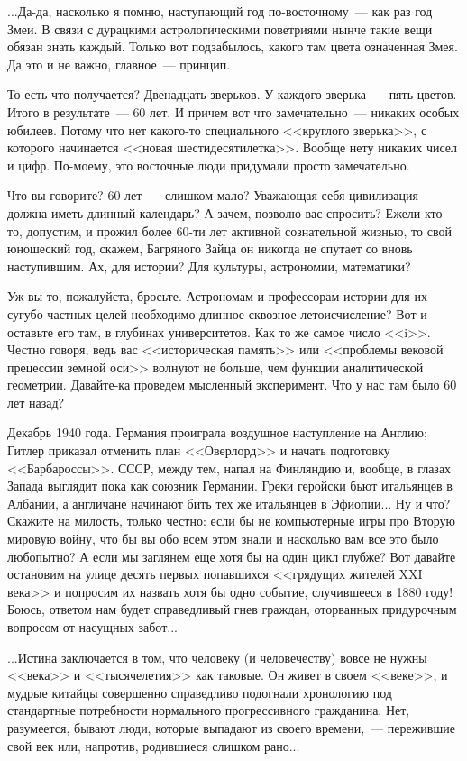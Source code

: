 \documentclass{scrbook}
\newcommand{\flqq}{<<}
\newcommand{\frqq}{>>}
\newcommand{\mdash}{~--- }
\newcommand{\commamdash}{~--- } %
\begin{document}
...Да-да, насколько я помню, наступающий год по-восточному{\mdash}как раз год Змеи. В связи с дурацкими астрологическими поветриями нынче такие вещи обязан знать каждый. Только вот подзабылось, какого там цвета означенная Змея. Да это и не важно, главное{\mdash}принцип.

То есть что получается? Двенадцать зверьков. У каждого зверька{\mdash}пять цветов. Итого в результате{\mdash}60 лет. И причем вот что замечательно{\mdash}никаких особых юбилеев. Потому что нет какого-то специального {\flqq}круглого зверька{\frqq}, с которого начинается {\flqq}новая шестидесятилетка{\frqq}. Вообще нету никаких чисел и цифр. По-моему, это восточные люди придумали просто замечательно.

Что вы говорите? 60 лет{\mdash}слишком мало? Уважающая себя цивилизация должна иметь длинный календарь? А зачем, позволю вас спросить? Ежели кто-то, допустим, и прожил более 60-ти лет активной сознательной жизнью, то свой юношеский год, скажем, Багряного Зайца он никогда не спутает со вновь наступившим. Ах, для истории? Для культуры, астрономии, математики?

Уж вы-то, пожалуйста, бросьте. Астрономам и профессорам истории для их сугубо частных целей необходимо длинное сквозное летоисчисление? Вот и оставьте его там, в глубинах университетов. Как то же самое число {\flqq}i{\frqq}. Честно говоря, ведь вас {\flqq}историческая память{\frqq} или {\flqq}проблемы вековой прецессии земной оси{\frqq} волнуют не больше, чем функции аналитической геометрии. Давайте-ка проведем мысленный эксперимент. Что у нас там было 60 лет назад?

Декабрь 1940 года. Германия проиграла воздушное наступление на Англию; Гитлер приказал отменить план {\flqq}Оверлорд{\frqq} и начать подготовку {\flqq}Барбароссы{\frqq}. СССР, между тем, напал на Финляндию и, вообще, в глазах Запада выглядит пока как союзник Германии. Греки геройски бьют итальянцев в Албании, а англичане начинают бить тех же итальянцев в Эфиопии... Ну и что? Скажите на милость, только честно: если бы не компьютерные игры про Вторую мировую войну, что бы вы обо всем этом знали и насколько вам все это было любопытно? А если мы заглянем еще хотя бы на один цикл глубже? Вот давайте остановим на улице десять первых попавшихся {\flqq}грядущих жителей XXI века{\frqq} и попросим их назвать хотя бы одно событие, случившееся в 1880 году! Боюсь, ответом нам будет справедливый гнев граждан, оторванных придурочным вопросом от насущных забот...

...Истина заключается в том, что человеку (и человечеству) вовсе не нужны {\flqq}века{\frqq} и {\flqq}тысячелетия{\frqq} как таковые. Он живет в своем {\flqq}веке{\frqq}, и мудрые китайцы совершенно справедливо подогнали хронологию под стандартные потребности нормального прогрессивного гражданина. Нет, разумеется, бывают люди, которые выпадают из своего времени,{\commamdash}пережившие свой век или, напротив, родившиеся слишком рано...
\end{document}
